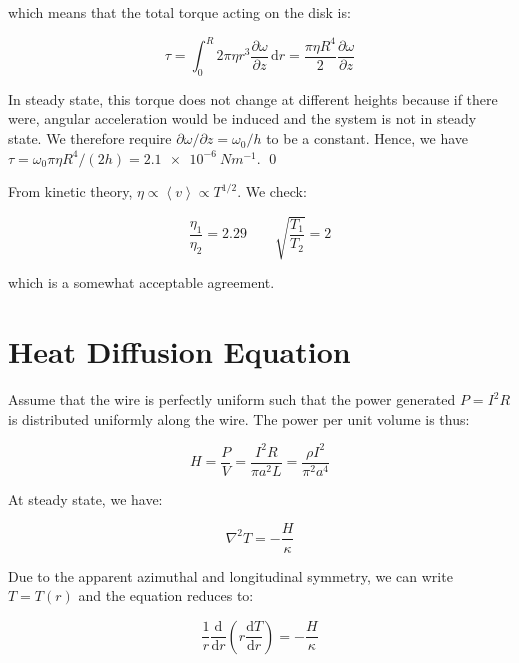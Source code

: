 \documentclass[12pt]{article}
\begin{document}
which means that the total torque acting on the disk is:

\begin{equation}
    \tau = \int_{0}^{R} 2\pi \eta r^{3} \frac{\partial \omega}{\partial z} \, \mathrm{d}r = \frac{\pi \eta R^{4}}{2} \frac{\partial \omega}{\partial z}
\end{equation}

In steady state, this torque does not change at different heights because if there were, angular acceleration would be induced and the system is not in steady state. We therefore require $\partial \omega/\partial z = \omega_{0}/h$ to be a constant. Hence, we have $\tau = \omega_{0}\pi \eta R^{4}/(2h) = \qty{2.1e-6}{Nm^{-1}}$.
\qed


From kinetic theory, $\eta \propto \left\langle v \right\rangle \propto T^{1/2}$. We check:

\begin{equation}
    \frac{\eta_{1}}{\eta_{2}} = 2.29 \qquad \sqrt{\frac{T_{1}}{T_{2}}} = 2
\end{equation}

which is a somewhat acceptable agreement.


\pagebreak
\section*{Heat Diffusion Equation}



Assume that the wire is perfectly uniform such that the power generated $P = I^{2}R$ is distributed uniformly along the wire. The power per unit volume is thus:

\begin{equation}
    H = \frac{P}{V} = \frac{I^{2}R}{\pi a^{2}L} = \frac{\rho I^{2}}{\pi^{2} a^{4}}
\end{equation}

At steady state, we have:

\begin{equation}
    \nabla^{2} T = -\frac{H}{\kappa}
\end{equation}

Due to the apparent azimuthal and longitudinal symmetry, we can write $T = T(r)$ and the equation reduces to:

\begin{equation}
    \frac{1}{r} \frac{\mathrm{d}}{\mathrm{d}r} \left( r \frac{\mathrm{d}T}{\mathrm{d}r} \right) = -\frac{H}{\kappa}
\end{equation}
\end{document}
